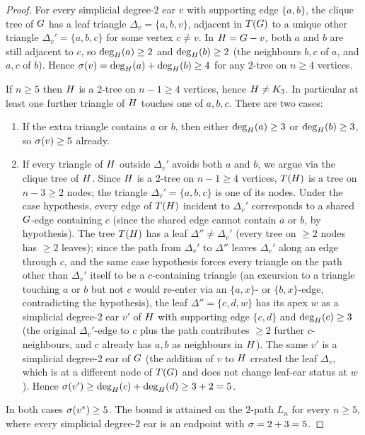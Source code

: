 \begin{proof}
For every simplicial degree-$2$ ear $v$ with supporting edge
$\{a, b\}$, the clique tree of $G$ has a leaf triangle
$\Delta_{v} = \{a, b, v\}$, adjacent in $T(G)$ to a unique
other triangle $\Delta_{v}' = \{a, b, c\}$ for some vertex $c \ne v$.
In $H = G - v$, both $a$ and $b$ are still adjacent to $c$,
so $\deg_{H}(a) \ge 2$ and $\deg_{H}(b) \ge 2$ (the
neighbours $b, c$ of $a$, and $a, c$ of $b$). Hence
$\sigma(v) = \deg_{H}(a) + \deg_{H}(b) \ge 4$ for any
$2$-tree on $n \ge 4$ vertices.

If $n \ge 5$ then $H$ is a $2$-tree on $n - 1 \ge 4$ vertices,
hence $H \ne K_{3}$. In particular at least one further triangle
of $H$ touches one of $a, b, c$. There are two cases:
\begin{enumerate}
\item If the extra triangle contains $a$ or $b$, then either
$\deg_{H}(a) \ge 3$ or $\deg_{H}(b) \ge 3$, so
$\sigma(v) \ge 5$ already.
\item If every triangle of $H$ outside $\Delta_{v}'$ avoids both
$a$ and $b$, we argue via the clique tree of $H$. Since
$H$ is a $2$-tree on $n - 1 \ge 4$ vertices, $T(H)$
is a tree on $n - 3 \ge 2$ nodes; the triangle $\Delta_{v}' =
\{a, b, c\}$ is one of its nodes. Under the case hypothesis, every
edge of $T(H)$ incident to $\Delta_{v}'$ corresponds to
a shared $G$-edge containing $c$ (since the shared edge cannot
contain $a$ or $b$, by hypothesis). The tree $T(H)$
has a leaf $\Delta'' \ne \Delta_{v}'$ (every tree on $\ge 2$ nodes has
$\ge 2$ leaves); since the path from $\Delta_{v}'$ to $\Delta''$
leaves $\Delta_{v}'$ along an edge through $c$, and the same case
hypothesis forces every triangle on the path other than $\Delta_{v}'$
itself to be a $c$-containing triangle (an excursion to a triangle
touching $a$ or $b$ but not $c$ would re-enter via an $\{a, x\}$- or
$\{b, x\}$-edge, contradicting the hypothesis), the leaf $\Delta''
= \{c, d, w\}$ has its apex $w$ as a simplicial degree-$2$ ear $v'$
of $H$ with supporting edge $\{c, d\}$ and $\deg_{H}(c)
\ge 3$ (the original $\Delta_{v}'$-edge to $c$ plus the path
contributes $\ge 2$ further $c$-neighbours, and $c$ already has
$a, b$ as neighbours in $H$). The same $v'$ is a simplicial
degree-$2$ ear of $G$ (the addition of $v$ to $H$ created
the leaf $\Delta_{v}$, which is at a different node of
$T(G)$ and does not change leaf-ear status at $w$).
Hence $\sigma(v') \ge \deg_{H}(c) + \deg_{H}(d)
\ge 3 + 2 = 5$.
\end{enumerate}
In both cases $\sigma(v^{*}) \ge 5$. The bound is attained on the
$2$-path $L_{n}$ for every $n \ge 5$, where every simplicial degree-$2$
ear is an endpoint with $\sigma = 2 + 3 = 5$.
\end{proof}


